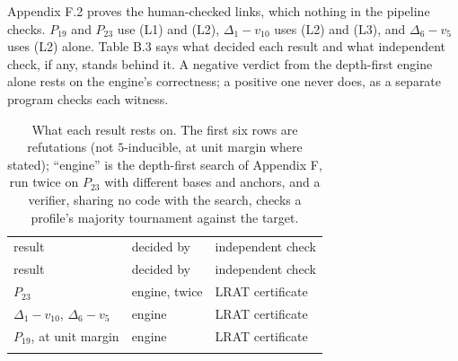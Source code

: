 \documentclass[
]{article}
\begin{document}

Appendix F.2 proves the human-checked links, which nothing in the
pipeline checks. \(P_{19}\) and \(P_{23}\) use (L1) and (L2),
\(\Delta_1 - v_{10}\) uses (L2) and (L3), and \(\Delta_6 - v_{5}\) uses
(L2) alone. Table B.3 says what decided each result and what independent
check, if any, stands behind it. A negative verdict from the depth-first
engine alone rests on the engine's correctness; a positive one never
does, as a separate program checks each witness.

\begin{longtable}[]{@{}
  >{\raggedright\arraybackslash}p{}
  >{\raggedright\arraybackslash}p{}
  >{\raggedright\arraybackslash}p{}@{}}
\caption{What each result rests on. The first six rows are refutations
(not \(5\)-inducible, at unit margin where stated); ``engine'' is the
depth-first search of Appendix F, run twice on \(P_{23}\) with different
bases and anchors, and a verifier, sharing no code with the search,
checks a profile's majority tournament against the
target.}\tabularnewline*
\toprule\noalign{}
\begin{minipage}[b]{\linewidth}\raggedright
result
\end{minipage} & \begin{minipage}[b]{\linewidth}\raggedright
decided by
\end{minipage} & \begin{minipage}[b]{\linewidth}\raggedright
independent check
\end{minipage} \\*
\midrule\noalign{}
\endfirsthead
\toprule\noalign{}
\begin{minipage}[b]{\linewidth}\raggedright
result
\end{minipage} & \begin{minipage}[b]{\linewidth}\raggedright
decided by
\end{minipage} & \begin{minipage}[b]{\linewidth}\raggedright
independent check
\end{minipage} \\*
\midrule\noalign{}
\endhead
\bottomrule\noalign{}
\endlastfoot
\(P_{23}\) & engine, twice & LRAT certificate \\*
\(\Delta_1 - v_{10}\), \(\Delta_6 - v_{5}\) & engine & LRAT
certificate \\*
\(P_{19}\), at unit margin & engine & LRAT certificate \\*

\end{longtable}
\end{document}
